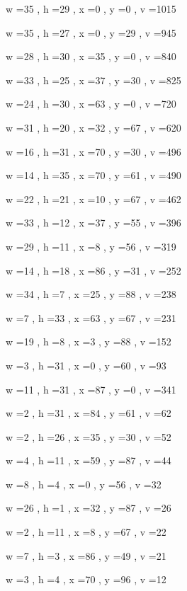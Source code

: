 \documentclass[11pt]{article}
\begin{document}
w =35 , h =29 , x =0 , y =0 , v =1015
\par
w =35 , h =27 , x =0 , y =29 , v =945
\par
w =28 , h =30 , x =35 , y =0 , v =840
\par
w =33 , h =25 , x =37 , y =30 , v =825
\par
w =24 , h =30 , x =63 , y =0 , v =720
\par
w =31 , h =20 , x =32 , y =67 , v =620
\par
w =16 , h =31 , x =70 , y =30 , v =496
\par
w =14 , h =35 , x =70 , y =61 , v =490
\par
w =22 , h =21 , x =10 , y =67 , v =462
\par
w =33 , h =12 , x =37 , y =55 , v =396
\par
w =29 , h =11 , x =8 , y =56 , v =319
\par
w =14 , h =18 , x =86 , y =31 , v =252
\par
w =34 , h =7 , x =25 , y =88 , v =238
\par
w =7 , h =33 , x =63 , y =67 , v =231
\par
w =19 , h =8 , x =3 , y =88 , v =152
\par
w =3 , h =31 , x =0 , y =60 , v =93
\par
w =11 , h =31 , x =87 , y =0 , v =341
\par
w =2 , h =31 , x =84 , y =61 , v =62
\par
w =2 , h =26 , x =35 , y =30 , v =52
\par
w =4 , h =11 , x =59 , y =87 , v =44
\par
w =8 , h =4 , x =0 , y =56 , v =32
\par
w =26 , h =1 , x =32 , y =87 , v =26
\par
w =2 , h =11 , x =8 , y =67 , v =22
\par
w =7 , h =3 , x =86 , y =49 , v =21
\par
w =3 , h =4 , x =70 , y =96 , v =12
\par
\newpage


\end{document}
